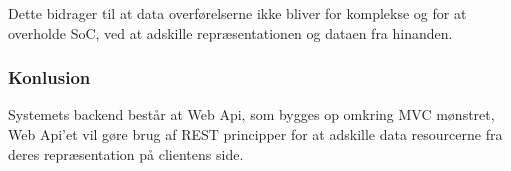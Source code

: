 \noindent Dette bidrager til at data overførelserne ikke bliver for komplekse og for at overholde SoC, ved at adskille repræsentationen og dataen fra hinanden.

\subsubsection{Konlusion}

Systemets backend består at Web Api, som bygges op omkring MVC mønstret, Web Api’et vil gøre brug af REST principper for at adskille data resourcerne fra deres repræsentation på clientens side.

\newpage
